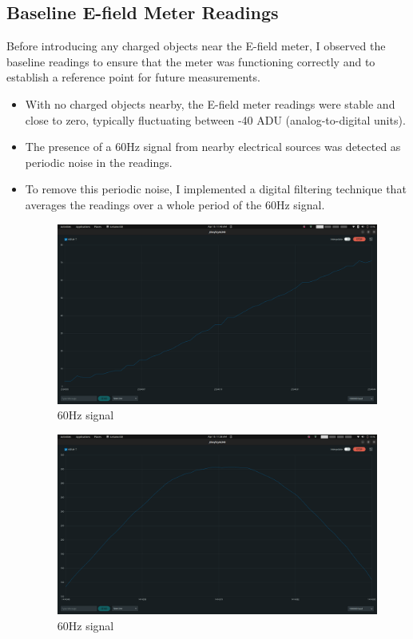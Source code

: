 \documentclass[a4paper,11pt]{article}%
\begin{document}
\subsection{Baseline E-field Meter Readings}
Before introducing any charged objects near the E-field meter, I observed the baseline readings to ensure that the meter was functioning correctly and to establish a reference point for future measurements.
\begin{itemize}
  \item With no charged objects nearby, the E-field meter readings were stable and close to zero, typically fluctuating between -40 ADU (analog-to-digital units).
  \item The presence of a 60Hz signal from nearby electrical sources was detected as periodic noise in the readings.
  \item To remove this periodic noise, I implemented a digital filtering technique that averages the readings over a whole period of the 60Hz signal.
        \begin{figure}[H]
          \centering
          \includegraphics[scale=0.2]{figures/periodic_noise.png}
          \caption{60Hz signal}
        \end{figure}

        \begin{figure}[H]
          \centering
          \includegraphics[scale=0.2]{figures/periodic_noise2.png}
          \caption{60Hz signal}
        \end{figure}

\end{itemize}
\end{document}
